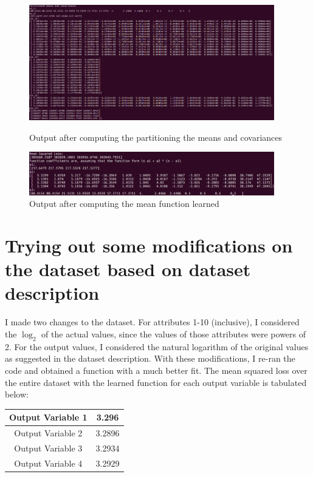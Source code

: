 \documentclass{article}
\begin{document}
\begin{figure}[H]
\begin{minipage}{0.66\linewidth}
\includegraphics[width=0.95\textwidth]{./images/output-2.png}
\caption{Output after computing the partitioning the means and covariances}
\end{minipage}
\hfill
\begin{minipage}{0.30\linewidth}
\includegraphics[width=0.95\textwidth]{./images/output-3.png}
\caption{Output after computing the mean function learned}
\end{minipage}
\end{figure}

\section*{Trying out some modifications on the dataset based on dataset description}
I made two changes to the dataset. For attributes 1-10 (inclusive), I considered the \(\log_{2}\) of the actual values, since the values of those attributes were powers of 2. For the output values, I considered the natural logarithm of the original values as suggested in the dataset description. With these modifications, I re-ran the code and obtained a function with a much better fit. The mean squared loss over the entire dataset with the learned function for each output variable is tabulated below:
\begin{center}
\begin{tabular}{|c|c|}
\hline
Output Variable 1 & 3.296 \\ \hline Output Variable 2 & 3.2896 \\
\hline
Output Variable 3 & 3.2934 \\ \hline Output Variable 4 & 3.2929 \\
\hline
\end{tabular}
\end{center}
\end{document}

